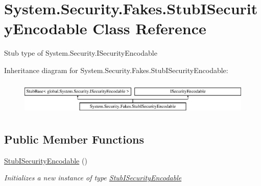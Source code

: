 \hypertarget{class_system_1_1_security_1_1_fakes_1_1_stub_i_security_encodable}{\section{System.\-Security.\-Fakes.\-Stub\-I\-Security\-Encodable Class Reference}
\label{class_system_1_1_security_1_1_fakes_1_1_stub_i_security_encodable}
}


Stub type of System.\-Security.\-I\-Security\-Encodable 


Inheritance diagram for System.\-Security.\-Fakes.\-Stub\-I\-Security\-Encodable\-:\begin{figure}[H]
\begin{center}
\leavevmode
\includegraphics[height=1.647059cm]{class_system_1_1_security_1_1_fakes_1_1_stub_i_security_encodable}
\end{center}
\end{figure}
\subsection*{Public Member Functions}
\begin{DoxyCompactItemize}
\item 
\hyperlink{class_system_1_1_security_1_1_fakes_1_1_stub_i_security_encodable_a43daf52bcc816eb4d169c0e3fa03e041}{Stub\-I\-Security\-Encodable} ()
\begin{DoxyCompactList}\small\item\em Initializes a new instance of type \hyperlink{class_system_1_1_security_1_1_fakes_1_1_stub_i_security_encodable}{Stub\-I\-Security\-Encodable}\end{DoxyCompactList}\end{DoxyCompactItemize}
